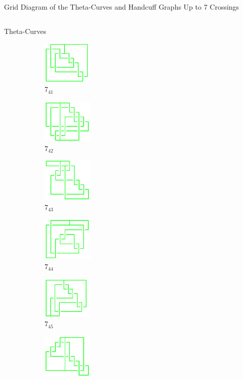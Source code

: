 \documentclass[final]{beamer}
\begin{document}
\begin{frame}[t]
\begin{alertblock}{Grid Diagram of the Theta-Curves and Handcuff Graphs Up to 7 Crossings}
\begin{columns}[t]
\begin{column}{0.6\textwidth}
\begin{alertblock}{Theta-Curves}
\begin{figure}
\begin{subfigure}{0.075\textwidth}
    \includegraphics[width=2.4cm]{../Midterm_Poster/grid_diagram/theta_7_41.png}
    \caption{$7_{41}$} 
    \end{subfigure}
    \begin{subfigure}{0.075\textwidth}
    \includegraphics[width=2.4cm]{../Midterm_Poster/grid_diagram/theta_7_42.png}
    \caption{$7_{42}$} 
    \end{subfigure}
    \begin{subfigure}{0.075\textwidth}
    \includegraphics[width=2.4cm]{../Midterm_Poster/grid_diagram/theta_7_43.png}
    \caption{$7_{43}$} 
    \end{subfigure}
    \begin{subfigure}{0.075\textwidth}
    \includegraphics[width=2.4cm]{../Midterm_Poster/grid_diagram/theta_7_44.png}
    \caption{$7_{44}$} 
    \end{subfigure}
    \begin{subfigure}{0.075\textwidth}
    \includegraphics[width=2.4cm]{../Midterm_Poster/grid_diagram/theta_7_45.png}
    \caption{$7_{45}$} 
    \end{subfigure}
    \begin{subfigure}{0.075\textwidth}
    \includegraphics[width=2.4cm]{../Midterm_Poster/grid_diagram/theta_7_46.png}

\end{subfigure}
\end{figure}
\end{alertblock}
\end{column}
\end{columns}
\end{alertblock}
\end{frame}
\end{document}
